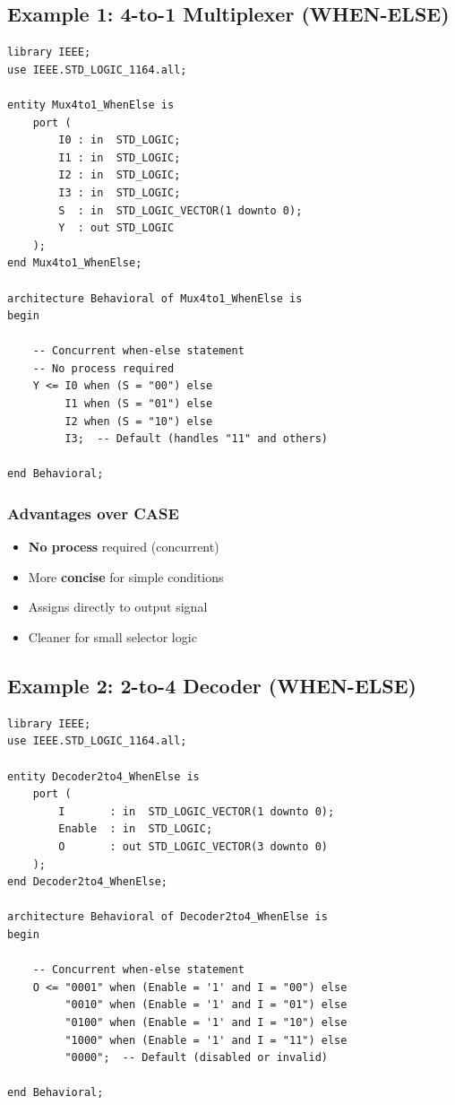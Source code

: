 \documentclass[12pt,a4paper]{article}
\begin{document}
\subsection{Example 1: 4-to-1 Multiplexer (WHEN-ELSE)}

\begin{lstlisting}
library IEEE;
use IEEE.STD_LOGIC_1164.all;

entity Mux4to1_WhenElse is
    port (
        I0 : in  STD_LOGIC;
        I1 : in  STD_LOGIC;
        I2 : in  STD_LOGIC;
        I3 : in  STD_LOGIC;
        S  : in  STD_LOGIC_VECTOR(1 downto 0);
        Y  : out STD_LOGIC
    );
end Mux4to1_WhenElse;

architecture Behavioral of Mux4to1_WhenElse is
begin
    
    -- Concurrent when-else statement
    -- No process required
    Y <= I0 when (S = "00") else
         I1 when (S = "01") else
         I2 when (S = "10") else
         I3;  -- Default (handles "11" and others)
    
end Behavioral;
\end{lstlisting}

\subsubsection{Advantages over CASE}
\begin{itemize}
    \item \textbf{No process} required (concurrent)
    \item More \textbf{concise} for simple conditions
    \item Assigns directly to output signal
    \item Cleaner for small selector logic
\end{itemize}

\subsection{Example 2: 2-to-4 Decoder (WHEN-ELSE)}

\begin{lstlisting}
library IEEE;
use IEEE.STD_LOGIC_1164.all;

entity Decoder2to4_WhenElse is
    port (
        I       : in  STD_LOGIC_VECTOR(1 downto 0);
        Enable  : in  STD_LOGIC;
        O       : out STD_LOGIC_VECTOR(3 downto 0)
    );
end Decoder2to4_WhenElse;

architecture Behavioral of Decoder2to4_WhenElse is
begin
    
    -- Concurrent when-else statement
    O <= "0001" when (Enable = '1' and I = "00") else
         "0010" when (Enable = '1' and I = "01") else
         "0100" when (Enable = '1' and I = "10") else
         "1000" when (Enable = '1' and I = "11") else
         "0000";  -- Default (disabled or invalid)
    
end Behavioral;
\end{lstlisting}
\end{document}
